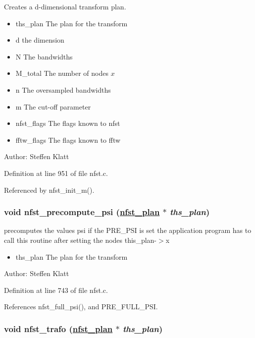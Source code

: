 Creates a d-dimensional transform plan. 

\begin{itemize}
\item ths\_\-plan The plan for the transform \item d the dimension \item N The bandwidths \item M\_\-total The number of nodes $x$ \item n The oversampled bandwidths \item m The cut-off parameter \item nfst\_\-flags The flags known to nfst \item fftw\_\-flags The flags known to fftw\end{itemize}
\begin{Desc}
\item[Author:]Steffen Klatt \end{Desc}


Definition at line 951 of file nfst.c.

Referenced by nfst\_\-init\_\-m().\hypertarget{group__nfsct_ga21}{
\subsubsection[nfst\_\-precompute\_\-psi]{\setlength{\rightskip}{0pt plus 5cm}void nfst\_\-precompute\_\-psi (\hyperlink{structnfst__plan}{nfst\_\-plan} $\ast$ {\em ths\_\-plan})}}
\label{group__nfsct_ga21}


precomputes the values psi if the PRE\_\-PSI is set the application program has to call this routine after setting the nodes this\_\-plan-$>$x 

\begin{itemize}
\item ths\_\-plan The plan for the transform\end{itemize}
\begin{Desc}
\item[Author:]Steffen Klatt \end{Desc}


Definition at line 743 of file nfst.c.

References nfst\_\-full\_\-psi(), and PRE\_\-FULL\_\-PSI.\hypertarget{group__nfsct_ga22}{
\subsubsection[nfst\_\-trafo]{\setlength{\rightskip}{0pt plus 5cm}void nfst\_\-trafo (\hyperlink{structnfst__plan}{nfst\_\-plan} $\ast$ {\em ths\_\-plan})}}
\label{group__nfsct_ga22}


